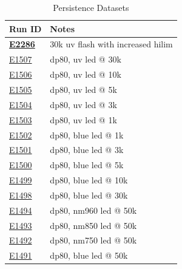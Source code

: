 \begin{table}[ht]
\centering
\caption{Persistence Datasets\label{table:runs_persistence}}
\begin{tabular}{|p{1.5cm}|p{9cm}|}
\hline
Run ID & Notes \\ \hline
\textbf{\href{https://s3df.slac.stanford.edu/data/rubin/lsstcam/E2286/w_2024_35/}{E2286}} & 30k uv flash with increased hilim\\ \hline
\href{https://s3df.slac.stanford.edu/data/rubin/lsstcam/E1507/w_2024_35/}{E1507} & dp80, uv led @ 30k \\ \hline
\href{https://s3df.slac.stanford.edu/data/rubin/lsstcam/E1506/w_2024_35/}{E1506} & dp80, uv led @ 10k\\ \hline
\href{https://s3df.slac.stanford.edu/data/rubin/lsstcam/E1505/w_2024_35/}{E1505} & dp80, uv led @ 5k\\ \hline
\href{https://s3df.slac.stanford.edu/data/rubin/lsstcam/E1504/w_2024_35/}{E1504} & dp80, uv led @ 3k\\ \hline
\href{https://s3df.slac.stanford.edu/data/rubin/lsstcam/E1503/w_2024_35/}{E1503} & dp80, uv led @ 1k\\ \hline
\href{https://s3df.slac.stanford.edu/data/rubin/lsstcam/E1502/w_2024_35/}{E1502} & dp80, blue led @ 1k\\ \hline
\href{https://s3df.slac.stanford.edu/data/rubin/lsstcam/E1501/w_2024_35/}{E1501} & dp80, blue led @ 3k\\ \hline
\href{https://s3df.slac.stanford.edu/data/rubin/lsstcam/E1500/w_2024_35/}{E1500} & dp80, blue led @ 5k\\ \hline
\href{https://s3df.slac.stanford.edu/data/rubin/lsstcam/E1499/w_2024_35/}{E1499} & dp80, blue led @ 10k\\ \hline
\href{https://s3df.slac.stanford.edu/data/rubin/lsstcam/E1498/w_2024_35/}{E1498} & dp80, blue led @ 30k\\ \hline
\href{https://s3df.slac.stanford.edu/data/rubin/lsstcam/E1494/w_2024_35/}{E1494} & dp80, nm960 led @ 50k\\ \hline
\href{https://s3df.slac.stanford.edu/data/rubin/lsstcam/E1493/w_2024_35/}{E1493} & dp80, nm850 led @ 50k\\ \hline
\href{https://s3df.slac.stanford.edu/data/rubin/lsstcam/E1492/w_2024_35/}{E1492} & dp80, nm750 led @ 50k\\ \hline
\href{https://s3df.slac.stanford.edu/data/rubin/lsstcam/E1491/w_2024_35/}{E1491} & dp80, blue led @ 50k\\ \hline

\end{tabular}
\end{table}
